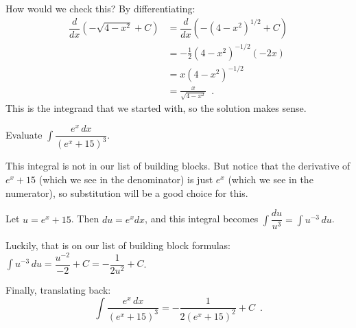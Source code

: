 \begin{example}
\begin{solution}
How would we check this? By differentiating:
\begin{align*}
\dfrac{d}{dx}\left(-\sqrt{4-x^2}+C \right) &= \dfrac{d}{dx}(-(4-x^2)^{1/2}+C)\\
  &= -\frac{1}{2}(4-x^2)^{-1/2}(-2x) \\
  &= x(4-x^2)^{-1/2}\\
  &= \frac{x}{\sqrt{4-x^2}} \enspace .
\end{align*}
This is the integrand that we started with, so the solution makes sense.
\end{solution}\end{example}

\begin{example}
Evaluate $\displaystyle\int \dfrac{e^x\,dx}{(e^x+15)^3}$.

\begin{solution}
This integral is not in our list of building blocks. But notice that the derivative of $e^x+15$ (which we see in the denominator) is just $e^x$ (which we see in the numerator), so substitution will be a good choice for this.

Let $u=e^x+15$. Then $du=e^xdx$, and this integral becomes $\displaystyle\int \dfrac{du}{u^3} = \displaystyle\int u^{-3}\,du$.

Luckily, that is on our list of building block formulas: $\displaystyle\int u^{-3}\, du = \dfrac{u^{-2}}{-2}+C = -\dfrac{1}{2u^2} + C$.

Finally, translating back:
$$\int \frac{e^x\,dx}{(e^x+15)^3} = -\frac{1}{2(e^x+15)^2}+C \enspace .$$
\end{solution}\end{example}

